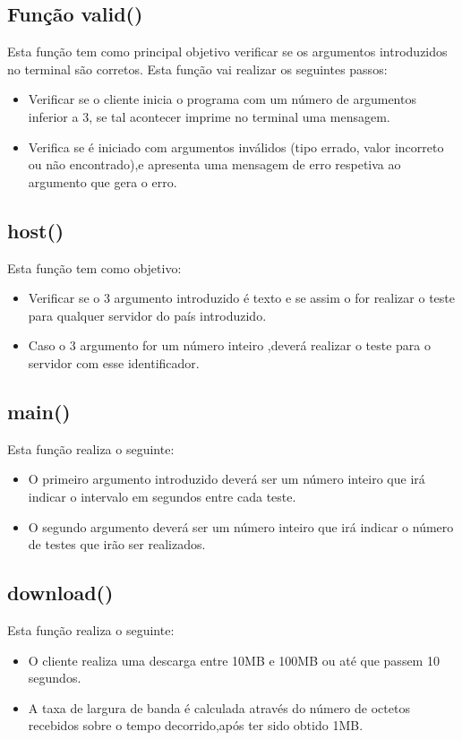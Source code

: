 \documentclass{report}
\begin{document}
\subsection{Função valid()}
Esta função tem como principal objetivo verificar se os argumentos introduzidos no terminal são corretos.
Esta função vai realizar os seguintes passos:
\begin{itemize}
    \item Verificar se o cliente inicia o programa com um número de argumentos inferior a 3, se tal acontecer imprime no terminal uma mensagem.
    \item Verifica se é iniciado com argumentos inválidos (tipo errado, valor incorreto ou não encontrado),e apresenta uma mensagem de erro respetiva ao argumento que gera o erro.
\end{itemize}

\subsection{host()}
Esta função tem como objetivo:
\begin{itemize}
    \item Verificar se o 3 argumento introduzido é texto e se assim o for realizar o teste para qualquer servidor do país introduzido.
    \item Caso o 3 argumento for um número inteiro ,deverá realizar o teste para o servidor com esse identificador.
\end{itemize}

\subsection{main()}
Esta função realiza o seguinte:
\begin{itemize}
    \item O primeiro argumento introduzido deverá ser um número inteiro que irá indicar o intervalo em segundos entre cada teste.
    \item O segundo argumento deverá ser um número inteiro que irá indicar o número de testes que irão ser realizados.
\end{itemize}

\subsection{download()}
Esta função realiza o seguinte:
\begin{itemize}
    \item O cliente realiza uma descarga entre 10MB e 100MB ou até que passem 10 segundos.
    \item A taxa de largura de banda é calculada através do número de octetos recebidos sobre o tempo decorrido,após ter sido obtido 1MB.
\end{itemize}
\end{document}
